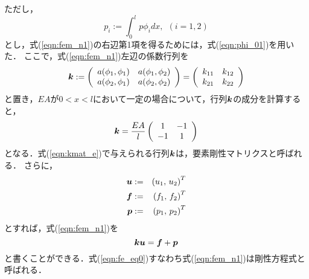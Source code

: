 \documentclass[10pt,a4j]{jarticle}
\begin{document}
ただし，
\begin{equation}
	p_i:=\int_{0}^{l} p \phi_i dx, \ \ (i=1,2)
	\label{eqn:def_pi}
\end{equation}
とし，式(\ref{eqn:fem_n1})の右辺第1項を得るためには，式(\ref{eqn:phi_01})を用いた．
ここで，式(\ref{eqn:fem_n1})左辺の係数行列を
\begin{equation}
	\mbox{\boldmath $k$}:=
	\left(
	\begin{array}{cc}
		a(\phi_1,\phi_1) & a(\phi_1,\phi_2)  \\
		a(\phi_2,\phi_1) & a(\phi_2,\phi_2)  
	\end{array}
	\right)
	=
	\left(
	\begin{array}{cc}
		k_{11} & k_{12}  \\
		k_{21} & k_{22}  
	\end{array}
	\right)
	\label{eqn:kmat_e}
\end{equation}
と置き，$EA$が$0<x<l$において一定の場合について，行列$\mbox{\boldmath $k$}$の成分を計算すると，
\begin{equation}
	\mbox{\boldmath $k$}=
	\frac{EA}{l}
	\left(
	\begin{array}{cc}
		1 & -1  \\
		-1 & 1  
	\end{array}
	\right)
\end{equation}
となる．式(\ref{eqn:kmat_e})で与えられる行列$\mbox{\boldmath $k$}$は，要素剛性マトリクスと呼ばれる．
さらに，
\begin{eqnarray}
	\mbox{\boldmath $u$} &:= & \left( u_1,\,u_2\right)^T 
	\label{eqn:def_uvec}
	\\
	\mbox{\boldmath $f$} &:= & \left( f_1,\,f_2\right)^T 
	\label{eqn:def_fvec}
	\\
	\mbox{\boldmath $p$} &:= & \left( p_1,\,p_2\right)^T 
	\label{eqn:def_pvec}
\end{eqnarray}
とすれば，式(\ref{eqn:fem_n1})を
\begin{equation}
	\mbox{\boldmath $k$}\mbox{\boldmath $u$}=\mbox{\boldmath $f$}+\mbox{\boldmath $p$}
	\label{eqn:fe_eq0}
\end{equation}
と書くことができる．式(\ref{eqn:fe_eq0})すなわち式(\ref{eqn:fem_n1})は剛性方程式と呼ばれる．
\end{document}
